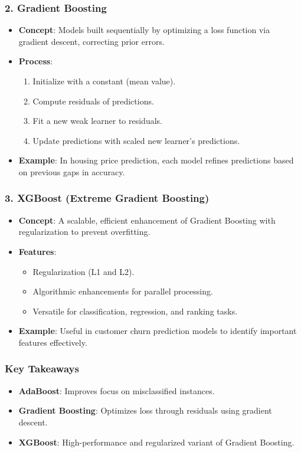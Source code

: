 \documentclass[aspectratio=169]{beamer}
\begin{document}
\begin{frame}[fragile]
    \frametitle{2. Gradient Boosting}
    \begin{itemize}
        \item \textbf{Concept}: Models built sequentially by optimizing a loss function via gradient descent, correcting prior errors.
        \item \textbf{Process}:
        \begin{enumerate}
            \item Initialize with a constant (mean value).
            \item Compute residuals of predictions.
            \item Fit a new weak learner to residuals.
            \item Update predictions with scaled new learner’s predictions.
        \end{enumerate}
        \item \textbf{Example}: In housing price prediction, each model refines predictions based on previous gaps in accuracy.
    \end{itemize}
\end{frame}

\begin{frame}[fragile]
    \frametitle{3. XGBoost (Extreme Gradient Boosting)}
    \begin{itemize}
        \item \textbf{Concept}: A scalable, efficient enhancement of Gradient Boosting with regularization to prevent overfitting.
        \item \textbf{Features}:
        \begin{itemize}
            \item Regularization (L1 and L2).
            \item Algorithmic enhancements for parallel processing.
            \item Versatile for classification, regression, and ranking tasks.
        \end{itemize}
        \item \textbf{Example}: Useful in customer churn prediction models to identify important features effectively.
    \end{itemize}
\end{frame}

\begin{frame}[fragile]
    \frametitle{Key Takeaways}
    \begin{itemize}
        \item \textbf{AdaBoost}: Improves focus on misclassified instances.
        \item \textbf{Gradient Boosting}: Optimizes loss through residuals using gradient descent.
        \item \textbf{XGBoost}: High-performance and regularized variant of Gradient Boosting.
    \end{itemize}
\end{frame}
\end{document}

